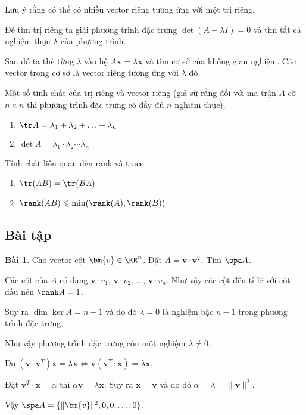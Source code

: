 Lưu ý rằng có thể có nhiều vector riêng tương ứng với một trị riêng.

Để tìm trị riêng ta giải phương trình đặc trưng $\det (A - \lambda I) = 0$ và tìm tất cả nghiệm thực $\lambda$ của phương trình.

Sau đó ta thế từng $\lambda$ vào hệ $A \bm{x} = \lambda \bm{x}$ và tìm cơ sở của không gian nghiệm. Các vector trong cơ sở là vector riêng tương ứng với $\lambda$ đó.

Một số tính chất của trị riêng và vector riêng (giả sử rằng đối với ma trận $A$ cỡ $n \times n$ thì phương trình đặc trưng có đầy đủ $n$ nghiệm thực).

\begin{enumerate}
    \item $\tr A = \lambda_1 + \lambda_2 + \ldots + \lambda_n$
    \item $\det A = \lambda_1 \cdot \lambda_2 \cdots \lambda_n$
\end{enumerate}

Tính chất liên quan đến rank và trace:

\begin{enumerate}
    \item $\tr (AB) = \tr (BA)$
    \item $\rank (AB) \leqslant \min(\rank(A), \rank(B))$
\end{enumerate}

\subsection*{Bài tập}

\textbf{Bài 1}. Cho vector cột $\bm{v} \in \RR^n$. Đặt $A = \bm{v} \cdot \bm{v}^T$. Tìm $\spa A$.

Các cột của $A$ có dạng $\bm{v} \cdot v_1$, $\bm{v} \cdot v_2$, ..., $\bm{v} \cdot v_n$. Như vậy các cột đều tỉ lệ với cột đầu nên $\rank A = 1$.

Suy ra $\dim \ker A = n-1$ và do đó $\lambda = 0$ là nghiệm bậc $n-1$ trong phương trình đặc trưng.

Như vậy phương trình đặc trưng còn một nghiệm $\lambda \neq 0$.

Do $(\bm{v} \cdot \bm{v}^T) \bm{x} = \lambda \bm{x} \Leftrightarrow \bm{v} (\bm{v}^T \cdot \bm{x}) = \lambda \bm{x}$.

Đặt $\bm{v}^T \cdot \bm{x} = \alpha$ thì $\alpha \bm{v} = \lambda \bm{x}$. Suy ra $\bm{x} = \bm{v}$ và do đó $\alpha = \lambda = \lVert \bm{v} \rVert^2$.

Vậy $\spa A = \{ \lVert \bm{v} \rVert^2, 0, 0, \ldots, 0\}$.

